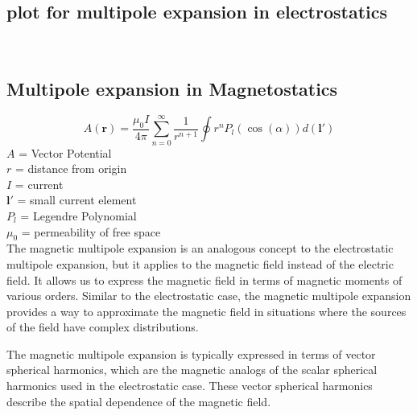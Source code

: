 \documentclass[12pt,a4paper]{article}
\begin{document}
\subsection{plot for multipole expansion in electrostatics}
 \\

\subsection{Multipole expansion in Magnetostatics}
\begin{equation}
A(\mathbf{r}) = \frac{\mu_0I}{4\pi} \sum_{n=0}^{\infty} \frac{1}{r^{n+1}} \oint r^{n} P_l(\cos(\alpha))d(\mathbf{l}') 
\end{equation}
$A$ = Vector Potential\\
$r$ = distance from origin \\
$I$ = current\\
$\mathbf{l}'$ = small current element\\
$P_l$ = Legendre Polynomial \\
$\mu_0$ = permeability of free space\\
The magnetic multipole expansion is an analogous concept to the electrostatic multipole expansion, but it applies to the magnetic field instead of the electric field. It allows us to express the magnetic field in terms of magnetic moments of various orders. Similar to the electrostatic case, the magnetic multipole expansion provides a way to approximate the magnetic field in situations where the sources of the field have complex distributions.

The magnetic multipole expansion is typically expressed in terms of vector spherical harmonics, which are the magnetic analogs of the scalar spherical harmonics used in the electrostatic case. These vector spherical harmonics describe the spatial dependence of the magnetic field.
\end{document}
